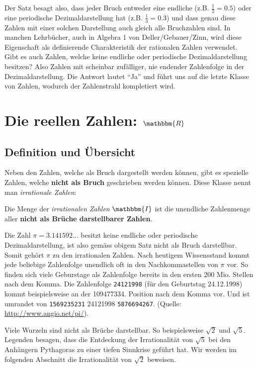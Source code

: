 Der Satz besagt also, dass jeder Bruch entweder eine endliche (z.B. $\tfrac{1}{2}=0.5$) oder eine periodische Dezimaldarstellung hat (z.B. $\tfrac{1}{3}=0.\overline{3}$) und dass genau diese Zahlen mit einer solchen Darstellung auch gleich alle Bruchzahlen sind. In manchen Lehrbücher, auch in Algebra 1 von Deller/Gebauer/Zinn, wird diese Eigenschaft als definierende Charakteristik der rationalen Zahlen verwendet.\\
Gibt es auch Zahlen, welche keine endliche oder periodische Dezimaldarstellung besitzen? Also Zahlen mit scheinbar zufälliger, nie endender Zahlenfolge in der Dezimaldarstellung.
Die Antwort lautet "`Ja"' und führt uns auf die letzte Klasse von Zahlen, wodurch der Zahlenstrahl kompletiert wird.
\section{Die reellen Zahlen: $\mathbbm{R}$}
\subsection{Definition und Übersicht} 
Neben den Zahlen, welche als Bruch dargestellt werden können, gibt es spezielle Zahlen, welche \textbf{nicht als Bruch} geschrieben werden können.
Diese Klasse nennt man \textit{irrationale Zahlen}:

\begin{definition}[$\mathbbm{I}$]
Die Menge der \emph{irrationalen Zahlen} $\mathbbm{I}$ ist die unendliche Zahlenmenge aller \textbf{nicht als Brüche darstellbarer Zahlen}.
\end{definition}

\begin{ex}
Die Zahl $\pi=3.141592...$ besitzt keine endliche oder periodische Dezimaldarstellung, ist also gemäss obigem Satz nicht als Bruch darstellbar. Somit gehört $\pi$ zu den irrationalen Zahlen. Nach heutigem Wissensstand kommt jede beliebige Zahlenfolge unendlich oft in den Nachkommastellen von $\pi$ vor. So finden sich viele Geburstage als Zahlenfolge bereits in den ersten 200 Mio. Stellen nach dem Komma. Die Zahlenfolge \texttt{24121998} (für den Geburtstag 24.12.1998) kommt beispielsweise an der 109477334. Position nach dem Komma vor. Und ist umrandet von \texttt{1569235231} 24121998 \texttt{5876694267}. (Quelle: \url{http://www.angio.net/pi/}).
\end{ex}
\begin{ex}
Viele Wurzeln sind nicht als Brüche darstellbar. So beispielsweise $\sqrt{2}$ und $\sqrt{5}$. 
Legenden besagen, dass die Entdeckung der Irrationalität von $\sqrt{5}$ bei den Anhängern Pythagoras zu einer tiefen Sinnkrise geführt hat.
Wir werden im folgenden Abschnitt die Irrationalität von $\sqrt{2}$ beweisen.
\end{ex}

